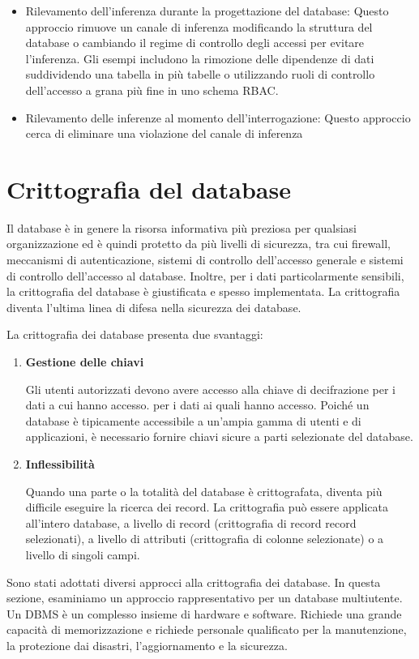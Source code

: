 \begin{itemize}
    \item Rilevamento dell'inferenza durante la progettazione del database: Questo approccio rimuove un canale di inferenza modificando la struttura del database o cambiando il regime di controllo degli accessi per evitare l'inferenza.  Gli esempi includono la rimozione delle dipendenze di dati suddividendo una tabella in più tabelle o utilizzando ruoli di controllo dell'accesso a grana più fine in uno schema RBAC.

    \item Rilevamento delle inferenze al momento dell'interrogazione: Questo approccio cerca di eliminare una violazione del canale di inferenza
\end{itemize}
\newpage
\section{Crittografia del database}
Il database è in genere la risorsa informativa più preziosa per qualsiasi organizzazione ed è quindi protetto da più livelli di sicurezza, tra cui firewall, meccanismi di autenticazione, sistemi di controllo dell'accesso generale e sistemi di controllo dell'accesso al database. Inoltre, per i dati particolarmente sensibili, la crittografia del database è giustificata e spesso implementata. La crittografia diventa l'ultima linea di difesa nella sicurezza dei database.

\singlespacing

La crittografia dei database presenta due svantaggi:

\begin{enumerate}
    \item \textbf{Gestione delle chiavi}
    
    Gli utenti autorizzati devono avere accesso alla chiave di decifrazione per i dati a cui hanno accesso. per i dati ai quali hanno accesso. Poiché un database è tipicamente accessibile a un'ampia gamma di utenti e di applicazioni, è necessario fornire chiavi sicure a parti selezionate del database. 
    
    \item \textbf{Inflessibilità}
    
    Quando una parte o la totalità del database è crittografata, diventa più difficile eseguire la ricerca dei record. La crittografia può essere applicata all'intero database, a livello di record (crittografia di record record selezionati), a livello di attributi (crittografia di colonne selezionate) o a livello di singoli campi.
\end{enumerate}
Sono stati adottati diversi approcci alla crittografia dei database. In questa sezione, esaminiamo un approccio rappresentativo per un database multiutente. Un DBMS è un complesso insieme di hardware e software. Richiede una grande
capacità di memorizzazione e richiede personale qualificato per la manutenzione, la protezione dai disastri, l'aggiornamento e la sicurezza.

